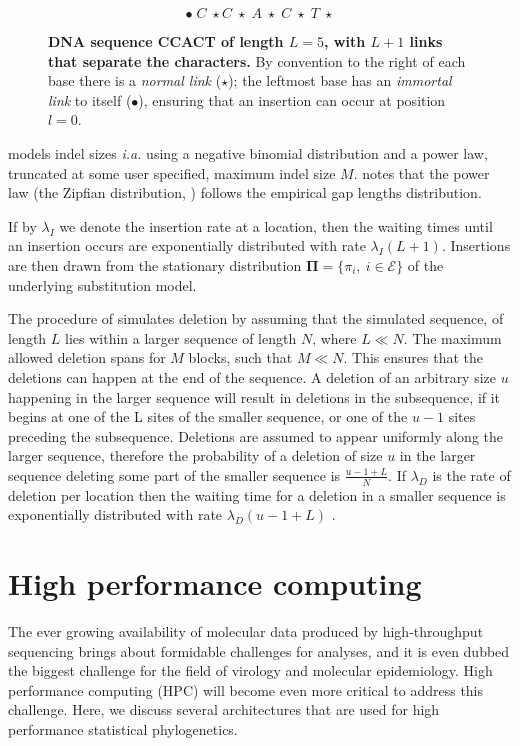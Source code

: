 \begin{figure}[H]
\centering
$$\bullet\; C\;\star C\;\star\; A\;\star\; C\;\star\; T\;\star$$
\caption{
{ \footnotesize 
{\bf DNA sequence CCACT of length $L=5$, with $L+1$ links that separate the characters.} 
By convention to the right of each base there is a \textit{normal link} ($\star$); the leftmost base has an \textit{immortal link} to itself ($\bullet$), ensuring that an insertion can occur at position $l=0$.
} %
}
\label{fig:indels}
\end{figure}

\cite{dawg} models indel sizes \textit{i.a.} using a negative binomial distribution and a power law, truncated at some user specified, maximum indel size $M$.
\cite{Benner1993} notes that the power law (the Zipfian distribution, \cite{Gonnet1991}) follows the empirical gap lengths distribution. 

If by $\lambda_{I}$ we denote the insertion rate at a location, then the waiting times until an insertion occurs are exponentially distributed with rate $\lambda_{I}(L+1)$.
Insertions are then drawn from the stationary distribution $\mathbf{\Pi}=\{\pi_{i},\ i\in\mathcal{E}\}$ of the underlying substitution model.

The procedure of \cite{dawg} simulates deletion by assuming that the simulated sequence, of length $L$ lies within a larger sequence of length $N$, where $L\ll N$.
The maximum allowed deletion spans for $M$ blocks, such that $M \ll N$.
This ensures that the deletions can happen at the end of the sequence.
A deletion of an arbitrary size $u$ happening in the larger sequence will result in deletions in the subsequence, if it begins at one of the L sites of the smaller sequence, or one of the $u-1$ sites preceding the subsequence.
Deletions are assumed to appear uniformly along the larger sequence, therefore the probability of a deletion of size $u$ in the larger sequence deleting some part of the smaller sequence is $\frac{u-1+L}{N}$.
If $\lambda_{D}$ is the rate of deletion per location then the waiting time for a deletion in a smaller sequence is exponentially distributed with rate $\lambda_{D}(u-1+L)$ \citep{dawg}.



\section{High performance computing\label{sec:hpc}}

The ever growing availability of molecular data produced by high-throughput sequencing brings about formidable challenges for analyses, and it is even dubbed the biggest challenge for the field of virology and molecular epidemiology. 
High performance computing (HPC) will become even more critical to address this challenge.
Here, we discuss several architectures that are used for high performance statistical phylogenetics. 

